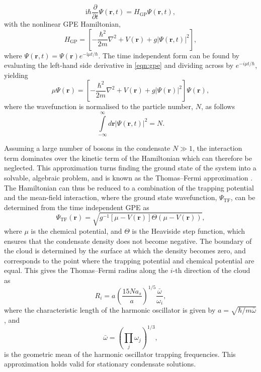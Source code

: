 \begin{equation}\label{eqn:gpe}
\textrm{i}\hbar\frac{\partial}{\partial t}\Psi(\mathbf{r},t) = H_{\textrm{GP}} \Psi(\textbf{r},t),
\end{equation}
with the nonlinear GPE Hamiltonian,
\begin{equation}\label{eqn:h_gp}
H_{\textrm{GP}} = \left[-\frac{\hbar^2}{2m}\nabla^2 + V(\textbf{r}) + g\vert\Psi(\mathbf{r},t)\vert^2 \right],
\end{equation}
where $\Psi(\textbf{r},t) = \Psi(\textbf{r})e^{-{\textrm{i}\mu t / \hbar}}$.
 The time independent form can be found by evaluating the left-hand side derivative in \eqref{eqn:gpe} and dividing across by $e^{-{i\mu t / \hbar}}$, yielding
\begin{equation}
\mu\Psi(\mathbf{r}) = \left[-\frac{\hbar^2}{2m}\nabla^2 + V(\mathbf{r}) + g\vert\Psi(\mathbf{r})\vert^2 \right]\Psi(\mathbf{r}),
\end{equation}
where the wavefunction is normalised to the particle number, $N$, as follows
\begin{equation}\label{eqn:norm}
\displaystyle\int\limits_{-\infty}^{\infty}d\mathbf{r} \left\vert \Psi\left(\mathbf{r},t\right) \right\vert^2 = N.
\end{equation}

Assuming a large number of bosons in the condensate $N\gg 1$, the interaction term dominates over the kinetic term of the Hamiltonian which can therefore be neglected. This approximation turns finding the ground state of the system into a solvable, algebraic problem, and is known as the Thomas--Fermi approximation \cite[~p. 84]{BK:Ueda_2010}. The Hamiltonian can thus be reduced to a combination of the trapping potential and the mean-field interaction, where the ground state wavefunction, $\Psi_{\textrm{TF}}$, can be determined from the time independent GPE as
\begin{equation}
\Psi_{\textrm{TF}}(\mathbf{r}) = \sqrt{ g^{-1}[\mu - V(\textbf{r})] \Theta(\mu - V(\textbf{r}))},
\end{equation}
where $\mu$ is the chemical potential, and $\Theta$ is the Heaviside step function, which ensures that the condensate density does not become negative. The boundary of the cloud is determined by the surface at which the density becomes zero, and corresponds to the point where the trapping potential and chemical potential are equal. This gives the Thomas--Fermi radius along the $i$-th direction of the cloud \cite[~p. 165]{BK:Pethick_Smith_2008} as
\begin{equation}
{R}_i = a_{\textrm{}}\left(\frac{15Na_s}{a_{\textrm{}}}\right)^{1/5}\frac{\bar{\omega}_{\textrm{}}}{\omega_i},
\end{equation}
where the characteristic length of the harmonic oscillator is given by
${a} = \sqrt{{\hbar}/{m\bar{\omega}}}$, and \[\bar{\omega} = \left(\displaystyle\prod\limits_j \omega_j\right)^{1/3},\] is the geometric mean of the harmonic oscillator trapping frequencies. This approximation holds valid for stationary condensate solutions.

